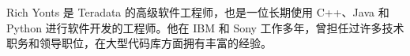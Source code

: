 

Rich Yonts 是 Teradata 的高级软件工程师，也是一位长期使用 C++、Java 和 Python 进行软件开发的工程师。他在 IBM 和 Sony 工作多年，曾担任过许多技术职务和领导职位，在大型代码库方面拥有丰富的经验。

